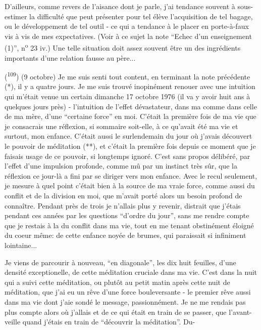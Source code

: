 D'ailleurs, comme revers de l'aisance dont je parle, j'ai tendance souvent à sous-estimer la difficulté que peut présenter pour tel élève l'acquisition de tel bagage, ou le développement de tel outil - ce qui a tendance à le placer en porte-à-faux vis à vis de mes expectatives. (Voir à ce sujet la note ``Echec d'un enseignement (1)'', n\textsuperscript{o} 23 iv.) Une telle situation doit assez souvent être un des ingrédients importants d'une relation fausse au père...

(\textsuperscript{109}) (9 octobre) Je me suis senti tout content, en terminant la note précédente (*), il y a quatre jours. Je me suis trouvé inopinément renouer avec une intuition qui m'était venue un certain dimanche 17 octobre 1976 (il va y avoir huit ans à quelques jours près) - l'intuition de l'effet dévastateur, dans ma  comme dans celle de ma mère, d'une ``certaine force'' en moi. C'était la première fois de ma vie que je consacrais une réflexion, si sommaire soit-elle, à ce qu'avait été ma vie et surtout, mon enfance. C'était aussi le surlendemain du jour où j'avais découvert le pouvoir de méditation (**), et c'était la première fois depuis ce moment que je faisais usage de ce pouvoir, si longtemps ignoré. C'est sans propos délibéré, par l'effet d'une impulsion profonde, comme mû par un instinct très sûr, que la réflexion ce jour-là a fini par se diriger vers mon enfance. Avec le recul seulement, je mesure à quel point c'était bien à la source de ma vraie force, comme aussi du conflit et de la division en moi, que m'avait porté alors un besoin profond de connaître. Pendant près de trois  je n'allais plus y revenir, distrait que j'étais pendant ces années par les  questions ``d'ordre du jour'', sans me rendre compte que je restais à la  du conflit dans ma vie, tout en me tenant obstinément éloigné du coeur même: de cette enfance noyée de brumes, qui paraissait si infiniment lointaine...

Je viens de parcourir à nouveau, ``en diagonale'', les dix huit feuilles, d'une densité exceptionelle, de cette méditation cruciale dans ma vie. C'est dans la nuit qui a suivi cette méditation, ou plutôt au petit matin après cette nuit de méditation, que j'ai eu un rêve d'une force bouleversante - le premier rêve aussi dans ma vie dont j'aie sondé le message, passionnément. Je ne me rendais pas plus compte alors où j'allais et de ce qui était en train de se passer, que l'avant-veille quand j'étais en train de ``découvrir la méditation''. Du-

